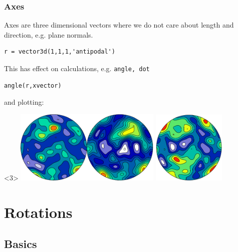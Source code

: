 \begin{frame}[fragile]
  \frametitle{Axes}

  Axes are three dimensional vectors where we do not care about length and
  direction, e.g. plane normals.

\begin{lstlisting}
r = vector3d(1,1,1,'antipodal')
\end{lstlisting}

\medskip
\pause

  This has effect on calculations, e.g. \texttt{angle, dot}
\begin{lstlisting}
angle(r,xvector)
\end{lstlisting}

\medskip
\pause

and plotting:

\begin{uncoverenv}<3>
  \includegraphics[width=7cm]{pic/vectorContour}
  \quad
  \includegraphics[width=3.5cm]{pic/vectorContourAntipodal}
\end{uncoverenv}


\end{frame}




\section{Rotations}

\subsection*{Basics}




